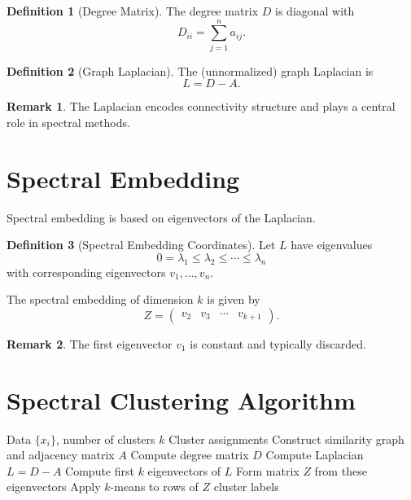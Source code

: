 \documentclass[12pt,oneside]{book}
\numberwithin{equation}{section}
\theoremstyle{definition}
\newtheorem{definition}{Definition}[section]
\newtheorem{remark}{Remark}[section]
\theoremstyle{plain}
\theoremstyle{remark}
\begin{document}
\begin{definition}[Degree Matrix]
The degree matrix $D$ is diagonal with
\[
D_{ii} = \sum_{j=1}^n a_{ij}.
\]
\end{definition}

\begin{definition}[Graph Laplacian]
The (unnormalized) graph Laplacian is
\[
L = D - A.
\]
\end{definition}

\begin{remark}
The Laplacian encodes connectivity structure and plays a central role in spectral methods.
\end{remark}

\section{Spectral Embedding}

Spectral embedding is based on eigenvectors of the Laplacian.

\begin{definition}[Spectral Embedding Coordinates]
Let $L$ have eigenvalues
\[
0 = \lambda_1 \le \lambda_2 \le \cdots \le \lambda_n
\]
with corresponding eigenvectors $v_1,\dots,v_n$.

The spectral embedding of dimension $k$ is given by
\[
Z =
\begin{pmatrix}
v_2 & v_3 & \cdots & v_{k+1}
\end{pmatrix}.
\]
\end{definition}

\begin{remark}
The first eigenvector $v_1$ is constant and typically discarded.
\end{remark}

\section{Spectral Clustering Algorithm}

\begin{algorithm}[H]
\caption{Spectral Clustering}
\begin{algorithmic}[1]
\Require Data $\{x_i\}$, number of clusters $k$
\Ensure Cluster assignments
\State Construct similarity graph and adjacency matrix $A$
\State Compute degree matrix $D$
\State Compute Laplacian $L = D - A$
\State Compute first $k$ eigenvectors of $L$
\State Form matrix $Z$ from these eigenvectors
\State Apply $k$-means to rows of $Z$
\State \Return cluster labels
\end{algorithmic}
\end{algorithm}
\end{document}
